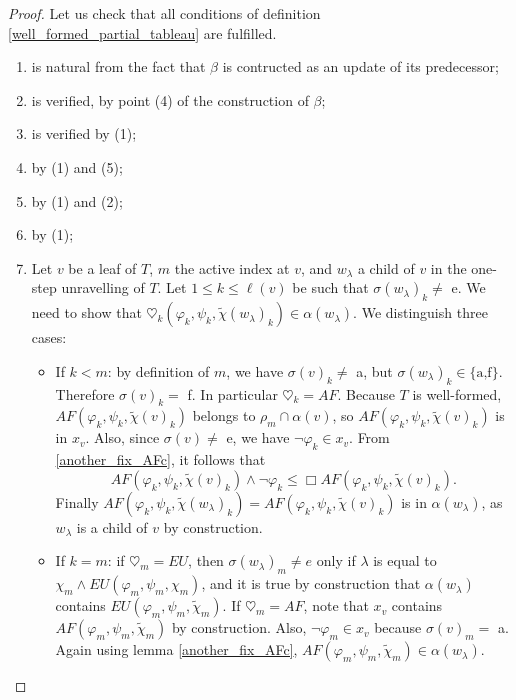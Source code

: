 \documentclass[11pt]{article}
\begin{document}
\begin{proof}
    Let us check that all conditions of definition \ref{well_formed_partial_tableau} are fulfilled.
    \begin{enumerate}[label=(\alph*)]
        \setlength\itemsep{0em}
        \item is natural from the fact that $\beta$ is contructed as an update of its predecessor;
        \item is verified, by point (4) of the construction of $\beta$;
        \item is verified by (1);
        \item by (1) and (5);
        \item by (1) and (2);
        \item by (1);
        \item Let $v$ be a leaf of $T$, $m$ the active index at $v$, and $w_\lambda$ a child of $v$ in the one-step unravelling of $T$. Let $1\leq k\leq\ell(v)$ be such that $\sigma(w_\lambda)_k\not=$ e. We need to show that $\heartsuit_k(\varphi_k,\psi_k,\tilde{\chi}(w_\lambda)_k)\in\alpha(w_\lambda)$. We distinguish three cases:
        \begin{itemize}
            \item If $k<m$: by definition of $m$, we have $\sigma(v)_k\not=$ a, but $\sigma(w_\lambda)_k\in\{\mbox{a,f}\}$. Therefore $\sigma(v)_k=$ f. In particular $\heartsuit_k=AF$. Because $T$ is well-formed, $AF(\varphi_k,\psi_k,\tilde{\chi}(v)_k)$ belongs to $\rho_m\cap\alpha(v)$, so $AF(\varphi_k,\psi_k,\tilde{\chi}(v)_k)$ is in $x_v$. Also, since $\sigma(v)\not=$ e, we have $\neg\varphi_k\in x_v$. From \ref{another_fix_AFc}, it follows that \[AF(\varphi_k,\psi_k,\tilde{\chi}(v)_k)\wedge\neg\varphi_k\leq\Box AF(\varphi_k,\psi_k,\tilde{\chi}(v)_k).\] Finally $AF(\varphi_k,\psi_k,\tilde{\chi}(w_\lambda)_k)=AF(\varphi_k,\psi_k,\tilde{\chi}(v)_k)$ is in $\alpha(w_\lambda)$, as $w_\lambda$ is a child of $v$ by construction.
            \item If $k=m$: if $\heartsuit_m = EU$, then $\sigma(w_\lambda)_m \not=e$ only if $\lambda$ is equal to $\chi_m\wedge EU(\varphi_m,\psi_m,\chi_m)$, and it is true by construction that $\alpha(w_\lambda)$ contains $EU(\varphi_m,\psi_m,\tilde{\chi}_m)$. If $\heartsuit_m = AF$, note that $x_v$ contains $AF(\varphi_m,\psi_m,\tilde{\chi}_m)$ by construction. Also, $\neg\varphi_m\in x_v$ because $\sigma(v)_m =$ a. Again using lemma \ref{another_fix_AFc}, $AF(\varphi_m,\psi_m,\tilde{\chi}_m)\in\alpha(w_\lambda)$.

\end{itemize}
\end{enumerate}
\end{proof}
\end{document}
